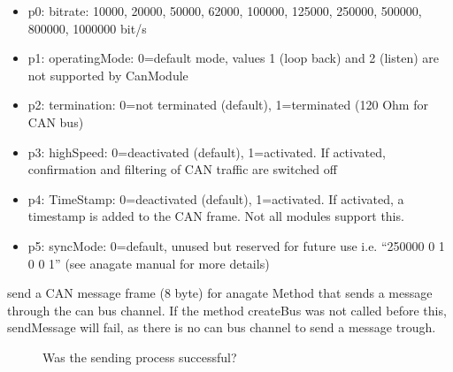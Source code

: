 \documentclass[letterpaper,10pt,english]{sphinxmanual}
\begin{document}
\begin{fulllineitems}
\begin{fulllineitems}
\begin{description}
\begin{itemize}
\begin{itemize}
\item {} 
p0: bitrate: 10000, 20000, 50000, 62000, 100000, 125000, 250000, 500000, 800000, 1000000 bit/s

\item {} 
p1: operatingMode: 0=default mode, values 1 (loop back) and 2 (listen) are not supported by CanModule

\item {} 
p2: termination: 0=not terminated (default), 1=terminated (120 Ohm for CAN bus)

\item {} 
p3: highSpeed: 0=deactivated (default), 1=activated. If activated, confirmation and filtering of CAN traffic are switched off

\item {} 
p4: TimeStamp: 0=deactivated (default), 1=activated. If activated, a timestamp is added to the CAN frame. Not all modules support this.

\item {} 
p5: syncMode: 0=default, unused but reserved for future use i.e. “250000 0 1 0 0 1” (see anagate manual for more details)

\end{itemize}


\end{itemize}

\end{description}


\end{fulllineitems}


\begin{fulllineitems}
\label{\detokenize{vendors/anagate:_CPPv4N10AnaCanScan11sendMessageEshPhb}}%
\pysigstartmultiline
{}\label{\detokenize{vendors/anagate:classAnaCanScan_1ad45666454318c891d7acd9fe16ae4c49}}%
\pysigstopmultiline
send a CAN message frame (8 byte) for anagate Method that sends a message through the can bus channel. If the method createBus was not called before this, sendMessage will fail, as there is no can bus channel to send a message trough. \begin{description}
\item[{}] \leavevmode
Was the sending process successful? 


\end{description}
\end{fulllineitems}
\end{fulllineitems}
\end{document}
